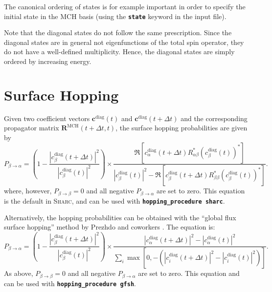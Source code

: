 \documentclass[a4paper,10pt,DIV=15,openany,twoside=false]{scrbook}
\newcommand{\sharc}{\textsc{Sharc}}
\newcommand{\ttt}[1]{\textbf{\texttt{#1}}}
\newcommand{\VEC}[1]{\ensuremath{\mathbf{#1}}}
\begin{document}
The canonical ordering of states is for example important in order to specify the initial state in the MCH basis (using the \ttt{state} keyword in the input file).

Note that the diagonal states do not follow the same prescription. Since the diagonal states are in general not eigenfunctions of the total spin operator, they do not have a well-defined multiplicity. 
Hence, the diagonal states are simply ordered by increasing energy.


\section{Surface Hopping}\label{met:hopping}

Given two coefficient vectors $\VEC{c}^{\text{diag}}(t)$ and $\VEC{c}^{\text{diag}}(t+\Delta t)$ and the corresponding propagator matrix $\VEC{R}^{\text{MCH}}(t+\Delta t,t)$, the surface hopping probabilities are given by
\begin{equation}
  P_{\beta\rightarrow\alpha}=
  \left(
    1-
    \frac{
      \left|
        c_\beta^{\text{diag}}(t+\Delta t)
      \right|^2
    }{
      \left|
        c_\beta^{\text{diag}}(t)
      \right|^2
    }\right)
    \times
    \frac{
      \Re\left[
        c^{\text{diag}}_\alpha(t+\Delta t)
        R^*_{\alpha\beta}
        \left(
          c^{\text{diag}}_\beta(t)
        \right)^*
      \right]
    }{
      \left|
        c^{\text{diag}}_\beta(t)
      \right|^2
      -\Re\left[
        c^{\text{diag}}_\beta(t+\Delta t)
        R^*_{\beta\beta}
        \left(
          c^{\text{diag}}_\beta(t)
        \right)^*
      \right]
    }.
\end{equation}
where, however, $P_{\beta\rightarrow\beta}=0$ and all negative $P_{\beta\rightarrow\alpha}$ are set to zero.
This equation is the default in \sharc, and can be used with \ttt{hopping\_procedure sharc}.

Alternatively, the hopping probabilities can be obtained with the ``global flux surface hopping'' method by Prezhdo and coworkers \cite{Wang2014JCTC}.
The equation is:
\begin{equation}
  P_{\beta\rightarrow\alpha}=
  \left(
    1-
    \frac{
      \left|
        c_\beta^{\text{diag}}(t+\Delta t)
      \right|^2
    }{
      \left|
        c_\beta^{\text{diag}}(t)
      \right|^2
    }\right)
    \times
    \frac{
      |c^{\text{diag}}_\alpha(t+\Delta t)|^2-|c^{\text{diag}}_\alpha(t)|^2
    }{
      \sum_{i} \max\left[0,-(|c^{\text{diag}}_i(t+\Delta t)|^2-|c^{\text{diag}}_i(t)|^2)\right]
    }.
\end{equation}
As above, $P_{\beta\rightarrow\beta}=0$ and all negative $P_{\beta\rightarrow\alpha}$ are set to zero.
This equation and can be used with \ttt{hopping\_procedure gfsh}.
\end{document}
